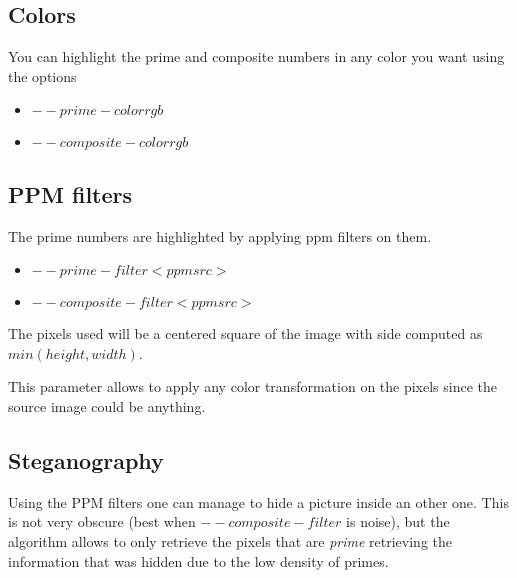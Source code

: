 \subsection{Colors}
You can highlight the prime and composite numbers in any color you want using the options

\begin{itemize}
	\item{$--prime-color r g b$}
	\item{$--composite-color r g b$}
\end{itemize}

\subsection{PPM filters}
The prime numbers are highlighted by applying ppm filters on them.

\begin{itemize}
	\item{$--prime-filter <ppm src>$}
	\item{$--composite-filter <ppm src>$}
\end{itemize}

The pixels used will be a centered square of the image with side computed as $min(height, width)$.

This parameter allows to apply any color transformation on the pixels since the source image could be anything.


\subsection{Steganography}
Using the PPM filters one can manage to hide a picture inside an other one. This is not very obscure (best when $--composite-filter$ is noise), but the algorithm allows to only retrieve the pixels that are \emph{prime} retrieving the information that was hidden due to the low density of primes.



